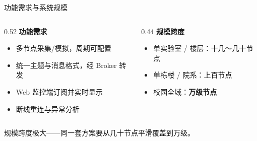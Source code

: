 \documentclass[aspectratio=169,10pt]{ctexbeamer}
\begin{document}
\begin{frame}{功能需求与系统规模}
  \vspace{8pt}
  \begin{columns}[T]
    \begin{column}{0.52\textwidth}
      \textbf{功能需求}
      {\footnotesize
      \begin{itemize}\itemsep=4pt
        \item 多节点采集/模拟，周期可配置
        \item 统一主题与消息格式，经 Broker 转发
        \item Web 监控端订阅并实时显示
        \item 断线重连与异常分析
      \end{itemize}}
    \end{column}
    \begin{column}{0.44\textwidth}
      \textbf{规模跨度}
      {\footnotesize
      \begin{itemize}\itemsep=4pt
        \item 单实验室 / 楼层：十几～几十节点
        \item 单栋楼 / 院系：上百节点
        \item 校园全域：\textbf{万级节点}
      \end{itemize}}
    \end{column}
  \end{columns}
  \vfill
  \begin{center}\small\color{black!55}
    规模跨度极大——同一套方案要从几十节点平滑覆盖到万级。
  \end{center}
\end{frame}
\end{document}
